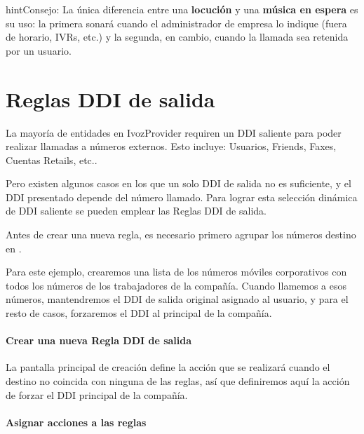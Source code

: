 \documentclass[letterpaper,10pt,spanish]{sphinxmanual}
\begin{document}
\begin{notice}{hint}{Consejo:}
La única diferencia entre una \textbf{locución} y una \textbf{música en espera} es su uso: la primera sonará cuando el administrador de empresa lo indique (fuera de horario, IVRs, etc.) y la segunda, en cambio, cuando la llamada sea retenida por un usuario.
\end{notice}


\section{Reglas DDI de salida}
\label{pbx_features/outgoingddi_rules:outgoing-ddi-rules}\label{pbx_features/outgoingddi_rules:outgoingddi-rules}\label{pbx_features/outgoingddi_rules::doc}
La mayoría de entidades en IvozProvider requiren un DDI saliente para poder realizar llamadas a números externos. Esto incluye: Usuarios, Friends, Faxes, Cuentas Retails, etc..

Pero existen algunos casos en los que un solo DDI de salida no es suficiente, y el DDI presentado depende del número llamado. Para lograr esta selección dinámica de DDI saliente se pueden emplear las Reglas DDI de salida.

Antes de crear una nueva regla, es necesario primero agrupar los números destino en {\hyperref[pbx_features/match_lists:match\string-lists]{}}.

Para este ejemplo, crearemos una lista de los números móviles corporativos con todos los números de los trabajadores de la compañía. Cuando llamemos a esos números, mantendremos el DDI de salida original asignado al usuario, y para el resto de casos, forzaremos el DDI al principal de la compañía.
\paragraph{Crear una nueva Regla DDI de salida}

La pantalla principal de creación define la acción que se realizará cuando el destino no coincida con ninguna de las reglas, así que definiremos aquí la acción de forzar el DDI principal de la compañía.

\paragraph{Asignar acciones a las reglas}
\end{document}
